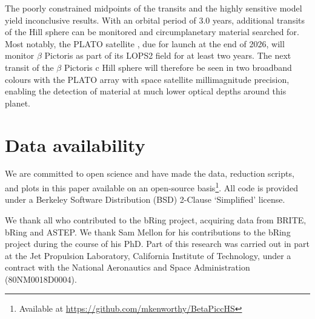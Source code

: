 \documentclass{aa}
\newcommand\picc{$\beta$ Pictoris c}
\newcommand\pic{$\beta$ Pictoris}
\begin{document}
The poorly constrained midpoints of the transits and the highly sensitive model yield inconclusive results. 
%
With an orbital period of 3.0 years, additional transits of the Hill sphere can be monitored and circumplanetary material searched for.
%
Most notably, the PLATO satellite \citep{2025ExA....59...26R}, due for launch at the end of 2026, will monitor \pic{} as part of its LOPS2 field for at least two years. 
%
The next transit of the \picc{} Hill sphere will therefore be seen in two broadband colours with the PLATO array with space satellite millimagnitude precision, enabling the detection of material at much lower optical depths around this planet.

\section{Data availability}

We are committed to open science and have made the data, reduction scripts, and plots in this paper available on an open-source basis\footnote{Available at \url{https://github.com/mkenworthy/BetaPiccHS}}.
%
All code is provided under a Berkeley Software Distribution (BSD) 2-Clause `Simplified' license.
%
\begin{acknowledgements}
We thank all who contributed to the bRing project, acquiring data from BRITE, bRing and ASTEP.
%
We thank Sam Mellon for his contributions to the bRing project during the course of his PhD.
%
Part of this research was carried out in part at the Jet Propulsion Laboratory, California Institute of Technology, under a contract with the National Aeronautics and Space Administration (80NM0018D0004).
\end{acknowledgements}




\end{document}
